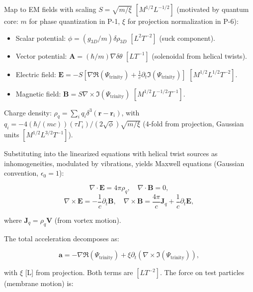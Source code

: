Map to EM fields with scaling $S = \sqrt{m / \xi}$ $[M^{1/2} L^{-1/2}]$ (motivated by quantum core: $m$ for phase quantization in P-1, $\xi$ for projection normalization in P-6):

\begin{itemize}
\item Scalar potential: $\phi = (g_{3D} / m) \delta \rho_{3D}$ $[L^2 T^{-2}]$ (suck component).
\item Vector potential: $\mathbf{A} = (\hbar / m) \nabla \delta \theta$ $[L T^{-1}]$ (solenoidal from helical twists).
\item Electric field: $\mathbf{E} = -S \left[ \nabla \Re(\Psi_{\text{trinity}}) + \frac{1}{c} \partial_t \Im(\Psi_{\text{trinity}}) \right]$ $[M^{1/2} L^{1/2} T^{-2}]$.
\item Magnetic field: $\mathbf{B} = S \nabla \times \Im(\Psi_{\text{trinity}})$ $[M^{1/2} L^{-1/2} T^{-1}]$.
\end{itemize}

Charge density: $\rho_q = \sum_i q_i \delta^3(\mathbf{r} - \mathbf{r}_i)$, with $q_i = -4 (\hbar / (m c)) (\tau \Gamma_i) / (2 \sqrt{\phi}) \sqrt{m / \xi}$ (4-fold from projection, Gaussian units $[M^{1/2} L^{3/2} T^{-1}]$).

Substituting into the linearized equations with helical twist sources as inhomogeneities, modulated by vibrations, yields Maxwell equations (Gaussian convention, $\epsilon_0 = 1$):

\begin{equation}
\nabla \cdot \mathbf{E} = 4\pi \rho_q, \quad \nabla \cdot \mathbf{B} = 0,
\end{equation}
\begin{equation}
\nabla \times \mathbf{E} = -\frac{1}{c} \partial_t \mathbf{B}, \quad \nabla \times \mathbf{B} = \frac{4\pi}{c} \mathbf{J}_q + \frac{1}{c} \partial_t \mathbf{E},
\end{equation}

where $\mathbf{J}_q = \rho_q \mathbf{V}$ (from vortex motion).

The total acceleration decomposes as:

\begin{equation}
\mathbf{a} = -\nabla \Re(\Psi_{\text{trinity}}) + \xi \partial_t (\nabla \times \Im(\Psi_{\text{trinity}})),
\end{equation}

with $\xi$ [L] from projection. Both terms are $[L T^{-2}]$. The force on test particles (membrane motion) is:

